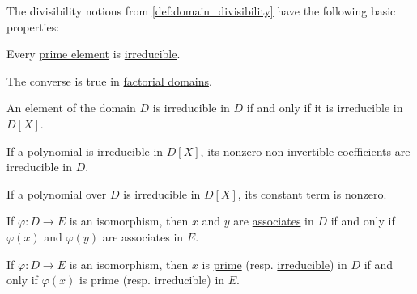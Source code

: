 \begin{proposition}\label{thm:def:domain_divisibility}
  The divisibility notions from \cref{def:domain_divisibility} have the following basic properties:
  \begin{thmenum}
     Every \hyperref[def:domain_divisibility/prime]{prime element} is \hyperref[def:domain_divisibility/irreducible]{irreducible}.

    The converse is true in \hyperref[def:factorial_domain]{factorial domains}.

     An element of the domain \( D \) is irreducible in \( D \) if and only if it is irreducible in \( D[X] \).


     If a polynomial is irreducible in \( D[X] \), its nonzero non-invertible coefficients are irreducible in \( D \).

     If a polynomial over \( D \) is irreducible in \( D[X] \), its constant term is nonzero.

     If \( \varphi: D \to E \) is an isomorphism, then \( x \) and \( y \) are \hyperref[def:domain_divisibility/associates]{associates} in \( D \) if and only if \( \varphi(x) \) and \( \varphi(y) \) are associates in \( E \).

     If \( \varphi: D \to E \) is an isomorphism, then \( x \) is \hyperref[def:domain_divisibility/prime]{prime} (resp. \hyperref[def:domain_divisibility/irreducible]{irreducible}) in \( D \) if and only if \( \varphi(x) \) is prime (resp. irreducible) in \( E \).
  \end{thmenum}
\end{proposition}
